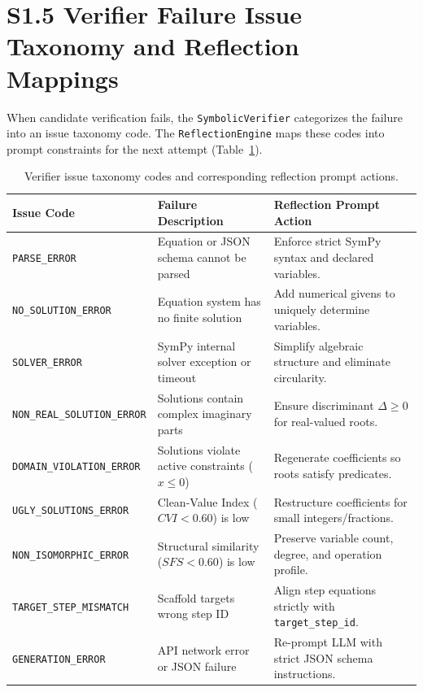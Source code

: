 \documentclass[11pt,letterpaper]{article}
\begin{document}
\section{S1.5 Verifier Failure Issue Taxonomy and Reflection Mappings}\label{sec:s15-issue-taxonomy}

When candidate verification fails, the \texttt{SymbolicVerifier} categorizes the failure into an issue taxonomy code. The \texttt{ReflectionEngine} maps these codes into prompt constraints for the next attempt (Table~\ref{tab:s1-issue-taxonomy}).

\begin{table}[htbp]
\centering
\small
\caption{Verifier issue taxonomy codes and corresponding reflection prompt actions.}
\label{tab:s1-issue-taxonomy}
\begin{tabular}{lll}
\toprule
Issue Code & Failure Description & Reflection Prompt Action \\
\midrule
\texttt{PARSE\_ERROR} & Equation or JSON schema cannot be parsed & Enforce strict SymPy syntax and declared variables. \\
\texttt{NO\_SOLUTION\_ERROR} & Equation system has no finite solution & Add numerical givens to uniquely determine variables. \\
\texttt{SOLVER\_ERROR} & SymPy internal solver exception or timeout & Simplify algebraic structure and eliminate circularity. \\
\texttt{NON\_REAL\_SOLUTION\_ERROR} & Solutions contain complex imaginary parts & Ensure discriminant $\Delta \ge 0$ for real-valued roots. \\
\texttt{DOMAIN\_VIOLATION\_ERROR} & Solutions violate active constraints ($x \le 0$) & Regenerate coefficients so roots satisfy predicates. \\
\texttt{UGLY\_SOLUTIONS\_ERROR} & Clean-Value Index ($CVI < 0.60$) is low & Restructure coefficients for small integers/fractions. \\
\texttt{NON\_ISOMORPHIC\_ERROR} & Structural similarity ($SFS < 0.60$) is low & Preserve variable count, degree, and operation profile. \\
\texttt{TARGET\_STEP\_MISMATCH} & Scaffold targets wrong step ID & Align step equations strictly with \texttt{target\_step\_id}. \\
\texttt{GENERATION\_ERROR} & API network error or JSON failure & Re-prompt LLM with strict JSON schema instructions. \\
\bottomrule
\end{tabular}
\end{table}
\end{document}
